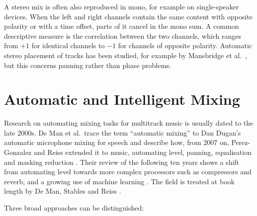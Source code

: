 A stereo mix is often also reproduced in mono, for example on single-speaker devices. When the left and right channels contain the same content with opposite polarity or with a time offset, parts of it cancel in the mono sum. A common descriptive measure is the correlation between the two channels, which ranges from $+1$ for identical channels to $-1$ for channels of opposite polarity. Automatic stereo placement of tracks has been studied, for example by Mansbridge et al.\ \cite{Mansbridge2012Pan}, but this concerns panning rather than phase problems.


\section{Automatic and Intelligent Mixing}
\label{sec:bg-automix}

Research on automating mixing tasks for multitrack music is usually dated to the late 2000s. De Man et al.\ trace the term ``automatic mixing'' to Dan Dugan's automatic microphone mixing for speech and describe how, from 2007 on, Perez-Gonzalez and Reiss extended it to music, automating level, panning, equalisation and masking reduction \cite{DeMan2017TenYears}. Their review of the following ten years shows a shift from automating level towards more complex processors such as compressors and reverb, and a growing use of machine learning \cite{DeMan2017TenYears}. The field is treated at book length by De Man, Stables and Reiss \cite{DeMan2019IMP}.

Three broad approaches can be distinguished:

